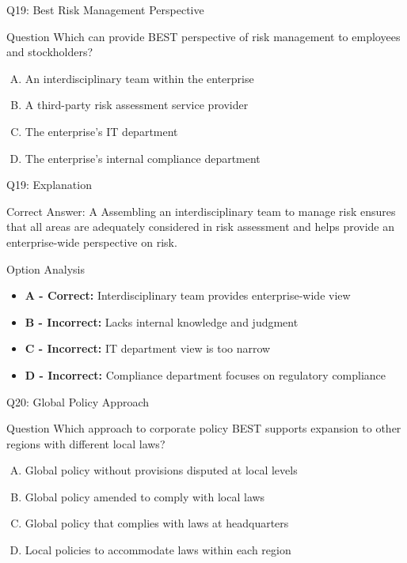 \documentclass{beamer}
\begin{document}
	\begin{frame}{Q19: Best Risk Management Perspective}
		\begin{block}{Question}
			Which can provide BEST perspective of risk management to employees and stockholders?
		\end{block}
		\begin{enumerate}[(A)]
			\item An interdisciplinary team within the enterprise
			\item A third-party risk assessment service provider
			\item The enterprise's IT department
			\item The enterprise's internal compliance department
		\end{enumerate}
	\end{frame}
	
	\begin{frame}{Q19: Explanation}
		\begin{block}{Correct Answer: A}
			Assembling an interdisciplinary team to manage risk ensures that all areas are adequately considered in risk assessment and helps provide an enterprise-wide perspective on risk.
		\end{block}
		\begin{block}{Option Analysis}
			\begin{itemize}
				\item \textbf{A - Correct:} Interdisciplinary team provides enterprise-wide view
				\item \textbf{B - Incorrect:} Lacks internal knowledge and judgment
				\item \textbf{C - Incorrect:} IT department view is too narrow
				\item \textbf{D - Incorrect:} Compliance department focuses on regulatory compliance
			\end{itemize}
		\end{block}
	\end{frame}
	
	\begin{frame}{Q20: Global Policy Approach}
		\begin{block}{Question}
			Which approach to corporate policy BEST supports expansion to other regions with different local laws?
		\end{block}
		\begin{enumerate}[(A)]
			\item Global policy without provisions disputed at local levels
			\item Global policy amended to comply with local laws
			\item Global policy that complies with laws at headquarters
			\item Local policies to accommodate laws within each region
		\end{enumerate}
	\end{frame}
	
\end{document}
